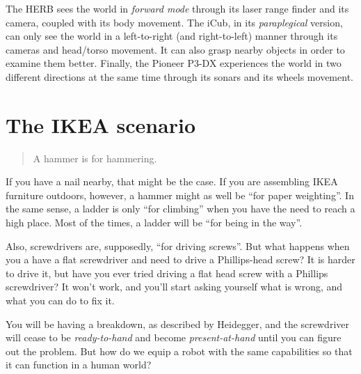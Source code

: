 \documentclass{article}
\begin{document}
The HERB sees the world in \emph{forward mode} through its laser range finder
and its camera, coupled with its body movement. The iCub, in its
\emph{paraplegical} version, can only see the world in a left-to-right (and
right-to-left) manner through its cameras and head/torso movement. It can also
grasp nearby objects in order to examine them better. Finally, the Pioneer P3-DX
experiences the world in two different directions at the same time through its
sonars and its wheels movement. 

\section{The IKEA scenario}

\begin{quotation}
  A hammer is for hammering.
\end{quotation}

If you have a nail nearby, that might be the case. If you are assembling IKEA
furniture outdoors, however, a hammer might as well be ``for paper weighting''.
In the same sense, a ladder is only ``for climbing'' when you have the need to
reach a high place. Most of the times, a ladder will be
``for being in the way''.

Also, screwdrivers are, supposedly, ``for driving screws''. But what happens
when you a have a flat screwdriver and need to drive a Phillips-head screw? It
is harder to drive it, but have you ever tried driving a flat head screw with a
Phillips screwdriver? It won't work, and you'll start asking yourself what is
wrong, and what you can do to fix it.

You will be having a breakdown, as described by Heidegger, and the screwdriver
will cease to be \emph{ready-to-hand} and become \emph{present-at-hand} until
you can figure out the problem. But how do we equip a robot with the same
capabilities so that it can function in a human world?



\end{document}
